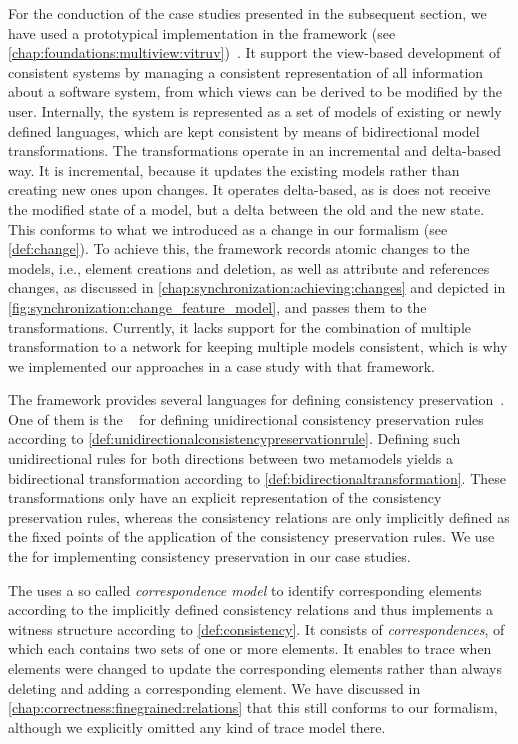 For the conduction of the case studies presented in the subsequent section, we have used a prototypical implementation in the \vitruv framework (see \autoref{chap:foundations:multiview:vitruv})~\cite{klare2020Vitruv-JSS}.
It support the view-based development of consistent systems by managing a consistent representation of all information about a software system, from which views can be derived to be modified by the user.
Internally, the system is represented as a set of models of existing or newly defined languages, which are kept consistent by means of bidirectional model transformations.
The transformations operate in an incremental and delta-based way. 
It is incremental, because it updates the existing models rather than creating new ones upon changes.
It operates delta-based, as is does not receive the modified state of a model, but a delta between the old and the new state.
This conforms to what we introduced as a change in our formalism (see \autoref{def:change}).
To achieve this, the framework records atomic changes to the models, i.e., element creations and deletion, as well as attribute and references changes, as discussed in \autoref{chap:synchronization:achieving:changes} and depicted in \autoref{fig:synchronization:change_feature_model}, and passes them to the transformations.
Currently, it lacks support for the combination of multiple transformation to a network for keeping multiple models consistent, which is why we implemented our approaches in a case study with that framework.

\mnote{\reactionslanguage}
The \vitruv framework provides several languages for defining consistency preservation~\cite{kramer2017a}. One of them is the \reactionslanguage~\cite{klare2016b} for defining unidirectional consistency preservation rules according to \autoref{def:unidirectionalconsistencypreservationrule}.
Defining such unidirectional rules for both directions between two metamodels yields a bidirectional transformation according to \autoref{def:bidirectionaltransformation}.
These transformations only have an explicit representation of the consistency preservation rules, whereas the consistency relations are only implicitly defined as the fixed points of the application of the consistency preservation rules.
We use the \reactionslanguage for implementing consistency preservation in our case studies.

The \reactionslanguage uses a so called \emph{correspondence model} to identify corresponding elements according to the implicitly defined consistency relations and thus implements a witness structure according to \autoref{def:consistency}.
It consists of \emph{correspondences}, of which each contains two sets of one or more elements.
It enables to trace when elements were changed to update the corresponding elements rather than always deleting and adding a corresponding element.
We have discussed in \autoref{chap:correctness:finegrained:relations} that this still conforms to our formalism, although we explicitly omitted any kind of trace model there.


